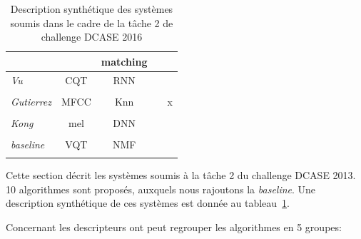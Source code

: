 \begin{table}[t]
\begin{center}
\begin{tabular}{lcccc}
\citep{Pikrakis2016}         &                              & matching             &           & \\ 
\hline
\emph{Vu}                    &     CQT                      & RNN                  &           & \\ 
\citep{Vu2016}               &                              &                      &           & \\ 
\hline
\emph{Gutierrez}             &     MFCC                     & Knn                  &           & x \\ 
\citep{GutierrezArriola2016} &                              &                      &           & \\ 
\hline
\emph{Kong}                  &     mel                      & DNN                  &           &  \\ 
\citep{Kong2016}             &                              &                      &           & \\ 
\hline  
\emph{baseline}              &     VQT                      & NMF                  &           & \\ 
\citep{Benetos2016}          &                              &                      &           & \\ 
\hline 
\end{tabular}
\end{center}
\caption{Description synthétique des systèmes soumis dans le cadre de la tâche 2 de challenge DCASE 2016}
\label{tab:systemsDcase2016}
\end{table}

Cette section décrit les systèmes soumis à la tâche 2 du challenge DCASE 2013. 10 algorithmes sont proposés, auxquels nous rajoutons la \emph{baseline}. Une description synthétique de ces systèmes est donnée au tableau~\ref{tab:systemsDcase2016}. 

Concernant les descripteurs ont peut regrouper les algorithmes en 5 groupes:

